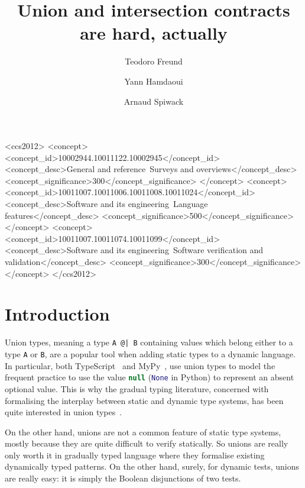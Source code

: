 \documentclass[sigplan,10pt,review,anonymous]{acmart}
\title{Union and intersection contracts are hard, actually}
\author{Teodoro Freund}
\affiliation{
  \institution{Universidad de Buenos Aires}
  \city{Buenos Aires}
  \country{Argentina}
}
\author{Yann Hamdaoui}
\affiliation{
  \institution{Tweag}
  \city{Paris}
  \country{France}
}
\author{Arnaud Spiwack}
\affiliation{
  \institution{Tweag}
  \city{Paris}
  \country{France}
}
\newcommand{\nickel}[1]{\lstinline[language=nickel]{#1}}
\newcommand{\typescript}[1]{\lstinline[language=JavaScript]{#1}}
\newcommand{\python}[1]{\lstinline[language=Python]{#1}}
\begin{document}
\begin{CCSXML}
<ccs2012>
   <concept>
       <concept_id>10002944.10011122.10002945</concept_id>
       <concept_desc>General and reference~Surveys and overviews</concept_desc>
       <concept_significance>300</concept_significance>
       </concept>
   <concept>
       <concept_id>10011007.10011006.10011008.10011024</concept_id>
       <concept_desc>Software and its engineering~Language features</concept_desc>
       <concept_significance>500</concept_significance>
       </concept>
   <concept>
       <concept_id>10011007.10011074.10011099</concept_id>
       <concept_desc>Software and its engineering~Software verification and validation</concept_desc>
       <concept_significance>300</concept_significance>
       </concept>
 </ccs2012>
\end{CCSXML}



\maketitle

\section{Introduction}
\label{sec:intro}

Union types, meaning a type \nickel{A @| B} containing values which
belong either to a type \nickel{A} or \nickel{B}, are a popular tool
when adding static types to a dynamic language. In particular, both
TypeScript~\cite{TypeScriptUnions} and MyPy~\cite{MyPyOptional}, use
union types to model the frequent practice to use the value
\typescript{null} (\python{None} in Python) to represent an absent
optional value. This is why the gradual typing literature, concerned
with formalising the interplay between static and dynamic type
systems, has been quite interested in union
types~\cite{RootCauseOfBlame,gradualCastagna,ORTIN2011278,ToroTanterGradualUnion,KeilThiemannUnionIntersection}.

On the other hand, unions are not a common feature of static type
systems, mostly because they are quite difficult to verify
statically. So unions are really only worth it in gradually typed
language where they formalise existing dynamically typed patterns. On
the other hand, surely, for dynamic tests, unions are really easy: it
is simply the Boolean disjunctions of two tests.
\end{document}
